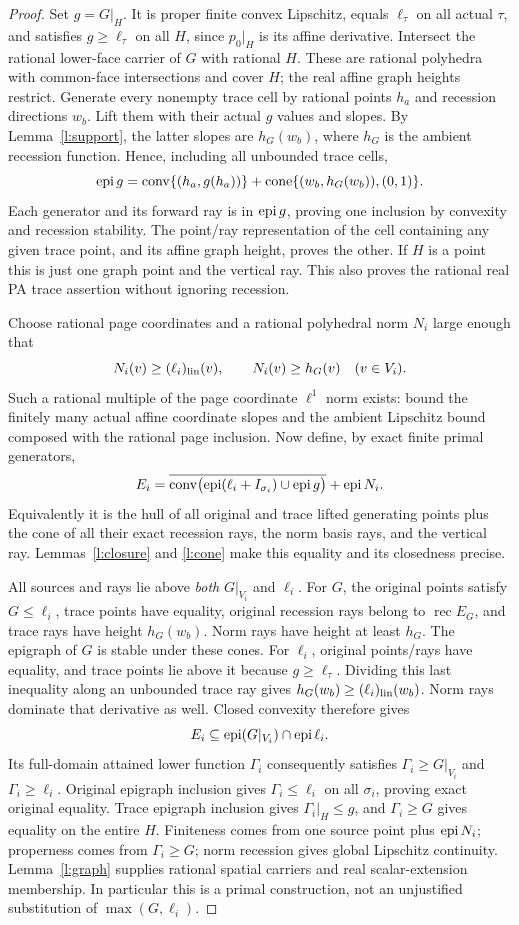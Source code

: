 \documentclass[11pt]{article}
\theoremstyle{definition}\newtheorem{definition}[theorem]{Definition}
\theoremstyle{remark}\newtheorem{remark}[theorem]{Remark}
\newcommand{\conv}{\operatorname{conv}}\newcommand{\cone}{\operatorname{cone}}
\newcommand{\rec}{\operatorname{rec}}\newcommand{\aff}{\operatorname{aff}}
\begin{document}
\begin{proof}
Set $g=G|_H$. It is proper finite convex Lipschitz, equals $\ell_\tau$ on all actual $\tau$, and satisfies $g\geq\ell_\tau$ on all $H$, since $p_0|_H$ is its affine derivative. Intersect the rational lower-face carrier of $G$ with rational $H$. These are rational polyhedra with common-face intersections and cover $H$; the real affine graph heights restrict. Generate every nonempty trace cell by rational points $h_a$ and recession directions $w_b$. Lift them with their actual $g$ values and slopes. By Lemma~\ref{l:support}, the latter slopes are $h_G(w_b)$, where $h_G$ is the ambient recession function. Hence, including all unbounded trace cells,
\[
 \epi g=\conv\{(h_a,g(h_a))\}
 +\cone\{(w_b,h_G(w_b)),(0,1)\}.
\]
Each generator and its forward ray is in $\operatorname{epi} g$, proving one inclusion by convexity and recession stability. The point/ray representation of the cell containing any given trace point, and its affine graph height, proves the other. If $H$ is a point this is just one graph point and the vertical ray. This also proves the rational real PA trace assertion without ignoring recession.

Choose rational page coordinates and a rational polyhedral norm $N_i$ large enough that
\[
 N_i(v)\geq (\ell_i)_{\rm lin}(v),\qquad N_i(v)\geq h_G(v)
 \quad(v\in V_i).
\]
Such a rational multiple of the page coordinate $\ell^1$ norm exists: bound the finitely many actual affine coordinate slopes and the ambient Lipschitz bound composed with the rational page inclusion. Now define, by exact finite primal generators,
\[
 E_i=\overline{\conv\bigl(\epi(\ell_i+I_{\sigma_i})\cup\epi g\bigr)}+\epi N_i.
\]
Equivalently it is the hull of all original and trace lifted generating points plus the cone of all their exact recession rays, the norm basis rays, and the vertical ray. Lemmas~\ref{l:closure} and \ref{l:cone} make this equality and its closedness precise.

All sources and rays lie above \emph{both} $G|_{V_i}$ and $\ell_i$. For $G$, the original points satisfy $G\leq\ell_i$, trace points have equality, original recession rays belong to $\rec E_G$, and trace rays have height $h_G(w_b)$. Norm rays have height at least $h_G$. The epigraph of $G$ is stable under these cones. For $\ell_i$, original points/rays have equality, and trace points lie above it because $g\geq\ell_\tau$. Dividing this last inequality along an unbounded trace ray gives $h_G(w_b)\geq(\ell_i)_{\rm lin}(w_b)$. Norm rays dominate that derivative as well. Closed convexity therefore gives
\[
 E_i\subseteq\operatorname{epi}(G|_{V_i})\cap\operatorname{epi}\ell_i.
\]
Its full-domain attained lower function $\Gamma_i$ consequently satisfies $\Gamma_i\geq G|_{V_i}$ and $\Gamma_i\geq\ell_i$. Original epigraph inclusion gives $\Gamma_i\leq\ell_i$ on all $\sigma_i$, proving exact original equality. Trace epigraph inclusion gives $\Gamma_i|_H\leq g$, and $\Gamma_i\geq G$ gives equality on the entire $H$. Finiteness comes from one source point plus $\operatorname{epi} N_i$; properness comes from $\Gamma_i\geq G$; norm recession gives global Lipschitz continuity. Lemma~\ref{l:graph} supplies rational spatial carriers and real scalar-extension membership. In particular this is a primal construction, not an unjustified substitution of $\max(G,\ell_i)$.


\end{proof}
\end{document}
